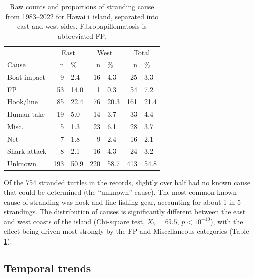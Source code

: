 \documentclass[sn-basic,NameDate]{sn-jnl}\usepackage[]{graphicx}\usepackage[]{xcolor}
\newenvironment{knitrout}{}{} %
\DeclareRobustCommand{\okina}{%
  \raisebox{\dimexpr\fontcharht\font`A-\height}{%
    \scalebox{0.8}{`}%
  }%
}
\newcommand{\Hawaii}{Hawai\okina i}
\begin{document}
\begin{table}[tbp]
\caption{Raw counts and proportions of stranding cause from 1983--2022 for \Hawaii\ island, separated into east and west sides.
Fibropapillomatosis is abbreviated FP.
}\label{tab:cause}
\begin{knitrout}
\color{fgcolor}
\begin{tabular}{lrlrlrl}
\toprule
\multicolumn{1}{c}{ } & \multicolumn{2}{c}{East} & \multicolumn{2}{c}{West} & \multicolumn{2}{c}{Total} \\
\cmidrule(l{3pt}r{3pt}){2-3} \cmidrule(l{3pt}r{3pt}){4-5} \cmidrule(l{3pt}r{3pt}){6-7}
Cause & n & \% & n & \% & n & \%\\
\midrule
Boat impact & 9 & 2.4 & 16 & 4.3 & 25 & 3.3\\
FP & 53 & 14.0 & 1 & 0.3 & 54 & 7.2\\
Hook/line & 85 & 22.4 & 76 & 20.3 & 161 & 21.4\\
Human take & 19 & 5.0 & 14 & 3.7 & 33 & 4.4\\
Misc. & 5 & 1.3 & 23 & 6.1 & 28 & 3.7\\
Net & 7 & 1.8 & 9 & 2.4 & 16 & 2.1\\
Shark attack & 8 & 2.1 & 16 & 4.3 & 24 & 3.2\\
Unknown & 193 & 50.9 & 220 & 58.7 & 413 & 54.8\\
\bottomrule
\end{tabular}

\end{knitrout}
\end{table}

Of the 754 stranded turtles in the records, slightly over half had no known cause that could be determined (the ``unknown'' cause).
The most common known cause of stranding was hook-and-line fishing gear, accounting for about 1 in 5 strandings.
The distribution of causes is significantly different between the east and west coasts of the island (Chi-square test, $X_{7}= 69.5$, $p < 10^{-10}$), 
with the effect being driven most strongly by the FP and Miscellaneous categories (Table \ref{tab:cause}).

\subsection{Temporal trends}
\end{document}

